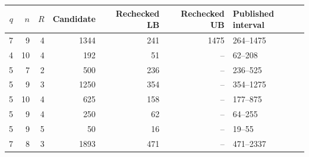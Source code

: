 \begin{tabular}{rrrrrrl}
\hline
$q$ & $n$ & $R$ & Candidate & Rechecked LB & Rechecked UB & Published interval\\
\hline
7 & 9 & 4 & 1344 & 241 & 1475 & 264--1475\\
4 & 10 & 4 & 192 & 51 & -- & 62--208\\
5 & 7 & 2 & 500 & 236 & -- & 236--525\\
5 & 9 & 3 & 1250 & 354 & -- & 354--1275\\
5 & 10 & 4 & 625 & 158 & -- & 177--875\\
5 & 9 & 4 & 250 & 62 & -- & 64--255\\
5 & 9 & 5 & 50 & 16 & -- & 19--55\\
7 & 8 & 3 & 1893 & 471 & -- & 471--2337\\
\hline
\end{tabular}

